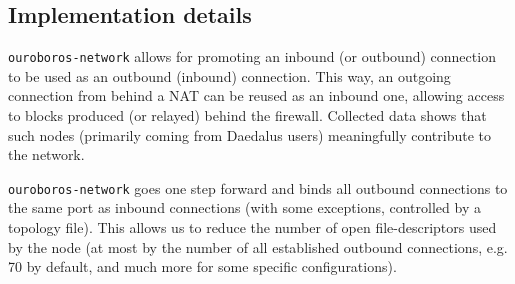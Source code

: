\subsection{Implementation details}
\texttt{ouroboros-network} allows for promoting an inbound (or outbound)
connection to be used as an outbound (inbound) connection.  This way, an
outgoing connection from behind a NAT can be reused as an inbound one, allowing
access to blocks produced (or relayed) behind the firewall.  Collected data
shows that such nodes (primarily coming from Daedalus users) meaningfully
contribute to the network.

\texttt{ouroboros-network} goes one step forward and binds all outbound
connections to the same port as inbound connections (with some exceptions,
controlled by a topology file).  This allows us to reduce the number of open
file-descriptors used by the node (at most by the number of all established
outbound connections, e.g. 70 by default, and much more for some specific
configurations).
